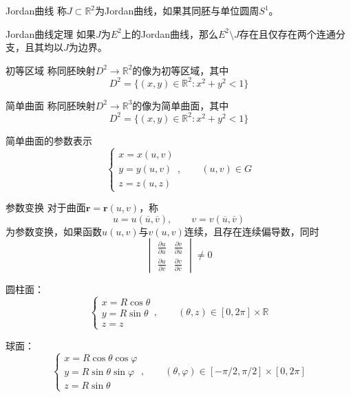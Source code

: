 \documentclass[lang = cn, scheme = chinese, thmcnt = section]{elegantbook}
\newcommand{\R}{\mathbb{R}}            %
\newcommand{\sub}{\subset}             %
\newcommand{\bs}{\boldsymbol}          %
\begin{document}
\begin{definition}{Jordan曲线}
	称$J\sub\R^2$为Jordan曲线，如果其同胚与单位圆周$S^1$。
\end{definition}

\begin{theorem}{Jordan曲线定理}
	如果$J$为$E^2$上的Jordan曲线，那么$E^2\setminus J$存在且仅存在两个连通分支，且其均以$J$为边界。
\end{theorem}

\begin{definition}{初等区域}
	称同胚映射$D^2\to\R^2$的像为初等区域，其中%
	$$
	D^2=\{ (x,y)\in\R^2:x^2+y^2<1 \}
	$$
\end{definition}

\begin{definition}{简单曲面}
	称同胚映射$D^2\to\R^3$的像为简单曲面，其中%
	$$
	D^2=\{ (x,y)\in\R^2:x^2+y^2<1 \}
	$$
\end{definition}

\begin{definition}{简单曲面的参数表示}
	$$
	\begin{cases}
		x=x(u,v)\\
		y=y(u,v)\\
		z=z(u,z)
	\end{cases},\qquad (u,v)\in G
	$$
\end{definition}

\begin{definition}{参数变换}
	对于曲面$\bs{r}=\bs{r}(u,v)$，称
	$$
	u=u(\overline{u},\overline{v}),\qquad 
	v=v(\overline{u},\overline{v})
	$$
	为参数变换，如果函数$u(u,v)$与$v(u,v)$连续，且存在连续偏导数，同时
	$$
	\begin{vmatrix}
		\frac{\partial u}{\partial \overline{u}} & \frac{\partial v}{\partial \overline{u}}\\
		\frac{\partial u}{\partial \overline{v}} & \frac{\partial v}{\partial \overline{v}}
	\end{vmatrix}\ne 0
	$$
\end{definition}

\begin{example}
	圆柱面：
	$$
	\begin{cases}
		x=R\cos\theta\\
		y=R\sin\theta\\
		z=z
	\end{cases},\qquad (\theta,z)\in [0,2\pi]\times \R
	$$
\end{example}

\begin{example}
	球面：
	$$
	\begin{cases}
		x=R\cos\theta\cos\varphi\\
		y=R\sin\theta\sin\varphi\\
		z=R\sin\theta
	\end{cases},\qquad (\theta,\varphi)\in [-\pi/2,\pi/2]\times [0,2\pi]
	$$
\end{example}
\end{document}
